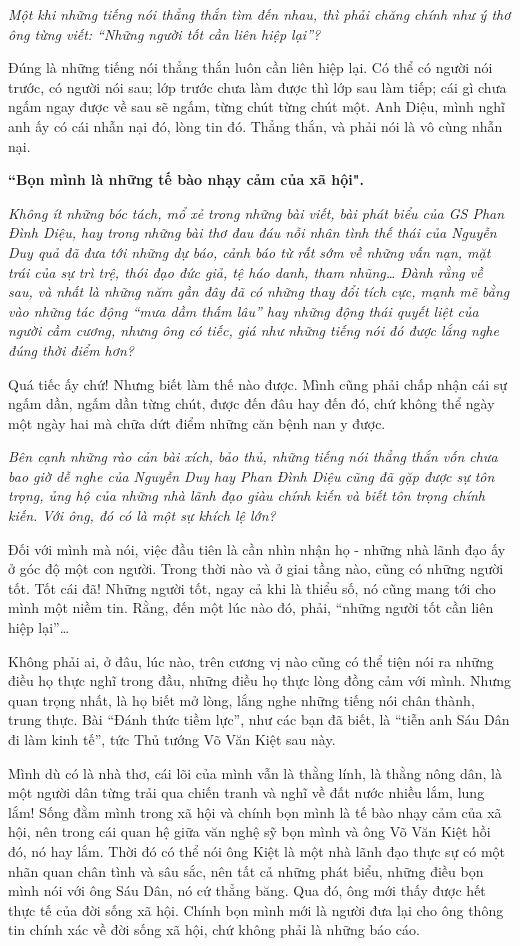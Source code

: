\emph{Một khi những tiếng nói thẳng thắn tìm đến nhau, thì phải chăng chính như ý thơ ông từng viết: “Những người tốt cần liên hiệp lại”?}

Đúng là những tiếng nói thẳng thắn luôn cần liên hiệp lại. Có thể có người nói trước, có người nói sau; lớp trước chưa làm được thì lớp sau làm tiếp; cái gì chưa ngấm ngay được về sau sẽ ngấm, từng chút từng chút một. Anh Diệu, mình nghĩ anh ấy có cái nhẫn nại đó, lòng tin đó. Thẳng thắn, và phải nói là vô cùng nhẫn nại.

{\bf “Bọn mình là những tế bào nhạy cảm của xã hội".}

\emph{Không ít những bóc tách, mổ xẻ trong những bài viết, bài phát biểu của GS Phan Đình Diệu, hay trong những bài thơ đau đáu nỗi nhân tình thế thái của Nguyễn Duy quả đã đưa tới những dự báo, cảnh báo từ rất sớm về những vấn nạn, mặt trái của sự trì trệ, thói đạo đức giả, tệ háo danh, tham nhũng… Đành rằng về sau, và nhất là những năm gần đây đã có những thay đổi tích cực, mạnh mẽ bằng vào những tác động “mưa dầm thấm lâu” hay những động thái quyết liệt của người cầm cương, nhưng ông có tiếc, giá như những tiếng nói đó được lắng nghe đúng thời điểm hơn?}

Quá tiếc ấy chứ! Nhưng biết làm thế nào được. Mình cũng phải chấp nhận cái sự ngấm dần, ngấm dần từng chút, được đến đâu hay đến đó, chứ không thể ngày một ngày hai mà chữa dứt điểm những căn bệnh nan y được.

\emph{Bên cạnh những rào cản bài xích, bảo thủ, những tiếng nói thẳng thắn vốn chưa bao giờ dễ nghe của Nguyễn Duy hay Phan Đình Diệu cũng đã gặp được sự tôn trọng, ủng hộ của những nhà lãnh đạo giàu chính kiến và biết tôn trọng chính kiến. Với ông, đó có là một sự khích lệ lớn? } 

Đối với mình mà nói, việc đầu tiên là cần nhìn nhận họ - những nhà lãnh đạo ấy ở góc độ một con người. Trong thời nào và ở giai tầng nào, cũng có những người tốt. Tốt cái đã! Những người tốt, ngay cả khi là thiểu số, nó cũng mang tới cho mình một niềm tin. Rằng, đến một lúc nào đó, phải, “những người tốt cần liên hiệp lại”…

 Không phải ai, ở đâu, lúc nào, trên cương vị nào cũng có thể tiện nói ra những điều họ thực nghĩ trong đầu, những điều họ thực lòng đồng cảm với mình. Nhưng quan trọng nhất, là họ biết mở lòng, lắng nghe những tiếng nói chân thành, trung thực. Bài “Đánh thức tiềm lực”, như các bạn đã biết, là “tiễn anh Sáu Dân đi làm kinh tế”, tức Thủ tướng Võ Văn Kiệt sau này. 

Mình dù có là nhà thơ, cái lõi của mình vẫn là thằng lính, là thằng nông dân, là một người dân từng trải qua chiến tranh và nghĩ về đất nước nhiều lắm, lung lắm! Sống đằm mình trong xã hội và chính bọn mình là tế bào nhạy cảm của xã hội, nên trong cái quan hệ giữa văn nghệ sỹ bọn mình và ông Võ Văn Kiệt hồi đó, nó hay lắm. Thời đó có thể nói ông Kiệt là một nhà lãnh đạo thực sự có một nhãn quan chân tình và sâu sắc, nên tất cả những phát biểu, những điều bọn mình nói với ông Sáu Dân, nó cứ thẳng băng. Qua đó, ông mới thấy được hết thực tế của đời sống xã hội. Chính bọn mình mới là người đưa lại cho ông thông tin chính xác về đời sống xã hội, chứ không phải là những báo cáo.

